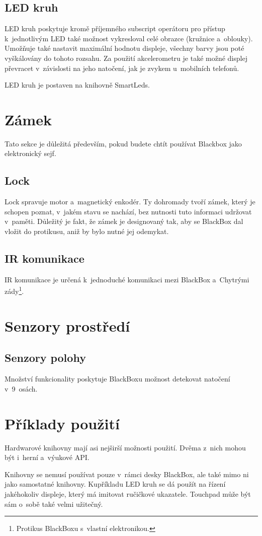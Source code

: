 \subsection{LED kruh}

LED kruh poskytuje kromě příjemného subscript operátoru pro přístup k~jednotlivým LED také možnost vykresloval celé obrazce (kružnice a~oblouky).
Umožňuje také nastavit maximální hodnotu displeje, všechny barvy jsou poté vyškálovány do tohoto rozsahu.
Za použití akcelerometru je také možné displej převracet v~závislosti na jeho natočení, jak je zvykem u~mobilních telefonů.

LED kruh je postaven na knihovně SmartLeds\cite{SmartLeds}.

\section{Zámek}

Tato sekce je důležitá především, pokud budete chtít používat Blackbox jako elektronický sejf.

\subsection{Lock}

Lock spravuje motor a~magnetický enkodér.
Ty dohromady tvoří zámek, který je schopen poznat, v~jakém stavu se nachází, bez nutnosti tuto informaci udržovat v~paměti.
Důležitý je fakt, že zámek je designovaný tak, aby se BlackBox dal vložit do protikusu, aniž by bylo nutné jej odemykat.

\subsection{IR komunikace}

IR komunikace je určená k~jednoduché komunikaci mezi BlackBox a~Chytrými zády\footnote{Protikus BlackBoxu s~vlastní elektronikou.}.


\section{Senzory prostředí}

\subsection{Senzory polohy}

Množství funkcionality poskytuje BlackBoxu možnost detekovat natočení v~9~osách. %

\section{Příklady použití}

Hardwarové knihovny mají asi nejširší možnosti použití.
Dvěma z~nich mohou být i~herní a~výukové API.

Knihovny se nemusí používat pouze v~rámci desky BlackBox, ale také mimo ni jako samostatné knihovny.
Kupříkladu LED kruh se dá použít na řízení jakéhokoliv displeje, který má imitovat ručičkové ukazatele.
Touchpad může být sám o~sobě také velmi užitečný.
